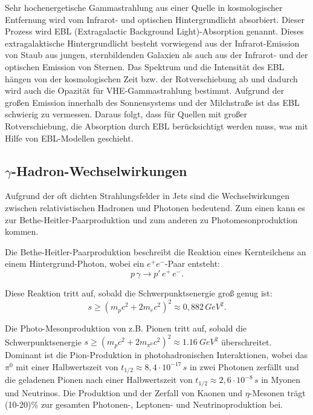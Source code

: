 Sehr hochenergetische Gammastrahlung aus einer Quelle in kosmologischer Entfernung wird vom Infrarot- und optischen Hintergrundlicht absorbiert. 
Dieser Prozess wird EBL (Extragalactic Background Light)-Absorption genannt. 
Dieses extragalaktische Hintergrundlicht besteht vorwiegend aus der Infrarot-Emission von Staub aus jungen, sternbildenden Galaxien als auch aus der Infrarot- und der optischen Emission von Sternen.
Das Spektrum und die Intensität des EBL hängen von der kosmologischen Zeit bzw. der Rotverschiebung ab und dadurch wird auch die Opazität für VHE-Gammastrahlung bestimmt.
Aufgrund der großen Emission innerhalb des Sonnensystems und der Milchstraße ist das EBL schwierig zu vermessen.
Daraus folgt, dass für Quellen mit großer Rotverschiebung, die Absorption durch EBL berücksichtigt werden muss, was mit Hilfe von EBL-Modellen geschieht.\cite{RelativisticJets}


\subsection{$\gamma$-Hadron-Wechselwirkungen}
Aufgrund der oft dichten Strahlungsfelder in Jets sind die Wechselwirkungen zwischen relativistischen Hadronen und Photonen bedeutend.
Zum einen kann es zur Bethe-Heitler-Paarproduktion und zum anderen zu Photomesonproduktion kommen.\cite{RelativisticJets}

Die Bethe-Heitler-Paarproduktion beschreibt die Reaktion eines Kernteilchens an einem Hintergrund-Photon, wobei ein $e^+e^-$-Paar entsteht:
\begin{equation}
 p \, \gamma \rightarrow p' \, e^+ \, e^-.
\end{equation}

Diese Reaktion tritt auf, sobald die Schwerpunktsenergie groß genug ist:
\begin{equation}
 s \geq (m_p c^2 +2 m_e c^2)^2 \approx 0,882\, \si{GeV^2}.
\end{equation}

Die Photo-Mesonproduktion von z.B. Pionen tritt auf, sobald die Schwerpunktsenergie $s \geq (m_p c^2 +2 m_{\pi^0} c^2)^2 \approx \SI{1,16}{GeV^2}$ überschreitet.
Dominant ist die Pion-Produktion in photohadronischen Interaktionen, wobei das $\pi^0$ mit einer Halbwertszeit von $t_{1/2}\approx 8,4\cdot 10^{-17}\,\si{s}$ in zwei Photonen zerfällt und die geladenen Pionen nach einer Halbwertszeit von $t_{1/2}\approx 2,6\cdot 10^{-8}\,\si{s}$ in Myonen und Neutrinos.
Die Produktion und der Zerfall von Kaonen und $\eta$-Mesonen trägt (10-20)\% zur gesamten Photonen-, Leptonen- und Neutrinoproduktion bei.\cite{RelativisticJets}

